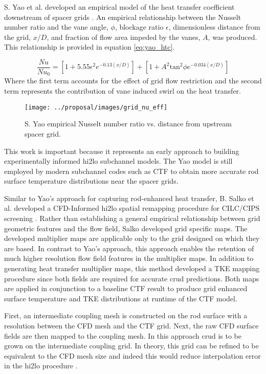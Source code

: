 S. Yao et al. developed an empirical model of the heat transfer coefficient downstream of spacer grids \cite{yao82}.
    An empirical relationship between the Nusselt number ratio and the vane angle, $\phi$, blockage ratio $\epsilon$, dimensionless distance from the grid, $x/D$, and fraction of flow area impeded by the vanes, $A$, was produced.  This relationship is provided in equation \ref{eq:yao_htc}.
    
\begin{equation}
\frac{Nu}{Nu_0}  = \left[ 1 + 5.55 \epsilon^2 e^{-0.13(x/D)}\right] + \left[ 1 + A^2\mathrm{tan}^2\phi e^{-0.034(x/D)} \right]
\label{eq:yao_htc}
\end{equation}
Where the first term accounts for the effect of grid flow restriction and the second term represents the contribution of vane induced swirl on the heat transfer.

\begin{figure}[H]
    \centering
    \texttt{[image: ../proposal/images/grid\_nu\_eff]}
    \caption{S. Yao empirical Nusselt number ratio vs. distance from upstream spacer grid.}
    \label{fig:gridnueff}
\end{figure}
This work is important because it represents an early approach to building experimentally informed hi2lo subchannel models.  The Yao model is still employed by modern subchannel codes such as CTF to obtain more accurate rod surface temperature distributions near the spacer grids.

    Similar to Yao's approach for capturing rod-enhanced heat transfer,  B. Salko et al. developed a CFD-Informed hi2lo spatial remapping procedure for CILC/CIPS screening \cite{salko17}.  Rather than establishing a general empirical relationship between grid geometric features and the flow field, Salko developed grid specific maps.  The developed multiplier maps are applicable only to the grid designed on which they are based.  In contrast to Yao's approach, this approach enables the retention of much higher resolution flow field features in the multiplier maps.  In addition to generating heat transfer multiplier maps, this method developed a TKE mapping procedure since both fields are required for accurate crud predictions.  Both maps are applied in conjunction to a baseline CTF result to produce grid enhanced surface temperature and TKE distributions at runtime of the CTF model.
    
    First, an intermediate coupling mesh is constructed on the rod surface with a resolution between the CFD mesh and the CTF grid.  Next, the raw CFD surface fields are then mapped to the coupling mesh.  In this approach crud is to be grown on the intermediate coupling grid.  In theory, this grid can be refined to be equivalent to the CFD mesh size and indeed this would reduce interpolation error in the hi2lo procedure \cite{salko17}.
       
